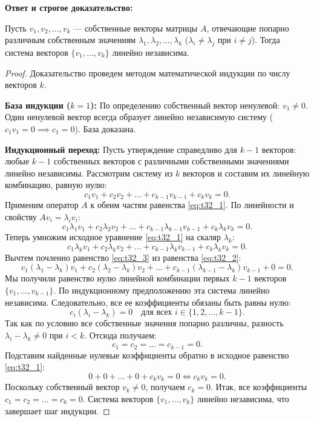 \textbf{Ответ и строгое доказательство:}

    \begin{theorem}
Пусть $v_1, v_2, \dots, v_k$ — собственные векторы матрицы $A$, отвечающие попарно различным собственным значениям
$\lambda_1, \lambda_2, \dots, \lambda_k$ ($\lambda_i \ne \lambda_j$ при $i \ne j$).
Тогда система векторов $\{v_1, \dots, v_k\}$ линейно независима.
    \end{theorem}
    \begin{proof}
Доказательство проведем методом математической индукции по числу векторов $k$.

\textbf{База индукции ($k = 1$):} По определению собственный вектор ненулевой: $v_1 \ne 0$.
Один ненулевой вектор всегда образует линейно независимую систему ($c_1 v_1 = 0 \implies c_1 = 0$).
База доказана.

\textbf{Индукционный переход:} Пусть утверждение справедливо для $k - 1$ векторов: любые $k - 1$ собственных векторов с
различными собственными значениями линейно независимы.
Рассмотрим систему из $k$ векторов и составим их линейную комбинацию, равную нулю:
        \begin{equation} \label{eq:t32_1} c_1 v_1 + c_2 v_2 + \dots + c_{k-1} v_{k-1} + c_k v_k = 0. \end{equation}
Применим оператор $A$ к обеим частям равенства \eqref{eq:t32_1}.
По линейности и свойству $A v_i=\lambda_i v_i$:
        \begin{equation} \label{eq:t32_2}
            c_1 \lambda_1 v_1 + c_2 \lambda_2 v_2 + \dots + c_{k-1} \lambda_{k-1} v_{k-1} + c_k \lambda_k v_k = 0.
        \end{equation}
Теперь умножим исходное уравнение \eqref{eq:t32_1} на скаляр $\lambda_k$:
        \begin{equation} \label{eq:t32_3}
            c_1 \lambda_k v_1 + c_2 \lambda_k v_2 + \dots + c_{k-1} \lambda_k v_{k-1} + c_k \lambda_k v_k = 0.
        \end{equation}
Вычтем почленно равенство \eqref{eq:t32_3} из равенства \eqref{eq:t32_2}: \[ c_1 (\lambda_1 - \lambda_k) v_1 + c_2
(\lambda_2 - \lambda_k) v_2 + \dots + c_{k-1} (\lambda_{k-1} - \lambda_k) v_{k-1} + 0 = 0.
\] Мы получили равенство нулю линейной комбинации первых $k - 1$ векторов $\{v_1, \dots, v_{k-1}\}$.
По индукционному предположению эта система линейно независима.
Следовательно, все ее коэффициенты обязаны быть равны нулю: \[ c_i (\lambda_i - \lambda_k) = 0 \quad \text{для всех } i
\in \{1, 2, \dots, k-1\}.
\] Так как по условию все собственные значения попарно различны, разность $\lambda_i - \lambda_k \ne 0$ при $i< k$.
Отсюда получаем: \[ c_1 = c_2 = \dots = c_{k-1} = 0.
\] Подставим найденные нулевые коэффициенты обратно в исходное равенство \eqref{eq:t32_1}: \[ 0 + 0 + \dots + 0 + c_k
v_k = 0 \iff c_k v_k = 0.
\] Поскольку собственный вектор $v_k \ne 0$, получаем $c_k = 0$.
Итак, все коэффициенты $c_1 = c_2 = \dots = c_k = 0$.
Система векторов $\{v_1, \dots, v_k\}$ линейно независима, что завершает шаг индукции.
    \end{proof}

